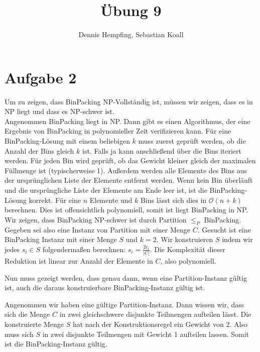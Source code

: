 \documentclass[12pt]{scrartcl}%
\theoremstyle{nonumberplain}
\newcommand{\bO}[1]{\mathcal O(#1)}
\begin{document}
\author{Dennis Hempfing, Sebastian Koall}
\title{Übung 9}
\date{} 
\pagestyle{myheadings}

\maketitle %

\section*{Aufgabe 2}

Um zu zeigen, dass {\sc BinPacking} NP-Vollständig ist, müssen wir zeigen, dass es in NP liegt und dass es NP-schwer ist.\\

Angenommen {\sc BinPacking} liegt in NP. Dann gibt es einen Algorithmus, der eine Ergebnis von {\sc BinPacking} in polynomieller Zeit verifizieren kann. Für eine {\sc BinPacking}-Lösung mit einem beliebigen $k$ muss zuerst geprüft werden, ob die Anzahl der Bins gleich $k$ ist. Falls ja kann anschließend über die Bins iteriert werden. Für jeden Bin wird geprüft, ob das Gewicht kleiner gleich der maximalen Füllmenge ist (typischerweise 1). Außerdem werden alle Elemente des Bins aus der ursprünglichen Liste der Elemente entfernt werden. Wenn kein Bin überläuft und die ursprüngliche Liste der Elemente am Ende leer ist, ist die {\sc BinPacking}-Lösung korrekt. Für eine $n$ Elemente und $k$ Bins lässt sich dies in $\bO{n+k}$ berechnen. Dies ist offensichtlich polynomiell, somit ist liegt {\sc BinPacking} in NP.\\

Wir zeigen, dass {\sc BinPacking} NP-schwer ist durch {\sc Partition} $\le_P$ {\sc BinPacking}. Gegeben sei also eine Instanz von {\sc Partition} mit einer Menge $C$. Gesucht ist eine {\sc BinPacking} Instanz mit einer Menge $S$ und $k=2$. Wir konstruieren $S$ indem wir jedes $s_i \in S$ folgendermaßen berechnen: $s_i = \frac{2c_i}{|C|}$. Die Komplexität dieser Reduktion ist linear zur Anzahl der Elemente in $C$, also polynomiell. 

Nun muss gezeigt werden, dass genau dann, wenn eine {\sc Partition}-Instanz gültig ist, auch die daraus konstruierbare {\sc BinPacking}-Instanz gültig ist.

Angenommen wir haben eine gültige {\sc Partition}-Instanz. Dann wissen wir, dass sich die Menge $C$ in zwei gleichschwere disjunkte Teilmengen aufteilen lässt. Die konstruierte Menge $S$ hat nach der Konstruktionsregel ein Gewicht von 2. Also muss sich $S$ in zwei disjunkte Teilmengen mit Gewicht 1 aufteilen lassen. Somit ist die {\sc BinPacking}-Instanz gültig.
\end{document}
